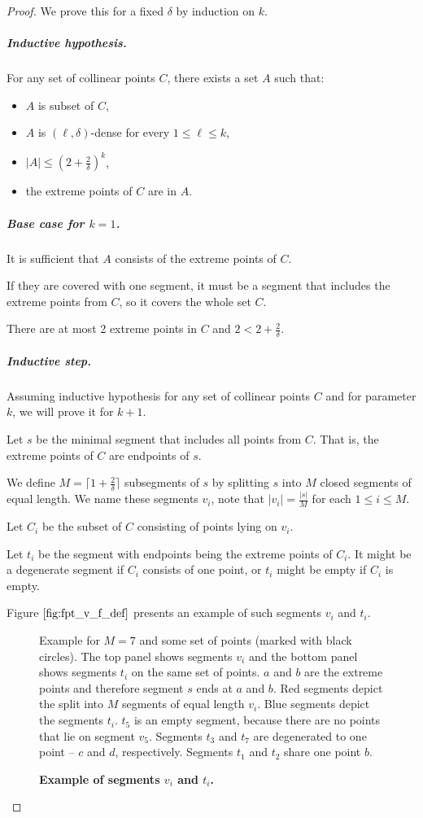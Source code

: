 \begin{proof}
We prove this for a fixed $\delta$ by induction on $k$.

\subparagraph{Inductive hypothesis.}
For any set of collinear points $C$, there exists a set $A$ such that:
\begin{itemize}
\item $A$ is subset of $C$,
\item $A$ is $(\ell, \delta)$-dense for every $1 \le \ell \le k$,
\item $|A| \le (2+\frac{2}{\delta})^k$,
\item the extreme points of $C$ are in $A$.
\end{itemize}

\subparagraph{Base case for $k = 1$.}
It is sufficient that $A$ consists of the extreme points of $C$.

If they are covered with one segment, it must be a segment 
that includes the extreme points from $C$, so it covers the whole set $C$.

There are at most 2 extreme points in $C$ and $2 < 2+\frac{2}{\delta}$.

\subparagraph{Inductive step.}
Assuming inductive hypothesis for any set of collinear points $C$
and for parameter $k$, we will prove it for $k+1$.

Let $s$ be the minimal segment that includes all points from $C$.
That is, the extreme points of $C$ are endpoints of $s$.

We define $M = \lceil1+\frac{2}{\delta}\rceil$ subsegments of $s$
by splitting $s$ into $M$ closed segments of equal length.
We name these segments $v_i$, note that
$|v_i| = \frac{|s|}{M}$ for each $1 \le i \le M$.

Let $C_i$ be the subset of $C$ consisting of points lying on $v_i$.

Let $t_i$ be the segment with endpoints being the extreme points of $C_i$.
It might be a degenerate segment if $C_i$ consists of one point,
or $t_i$ might be empty if $C_i$ is empty.

Figure $\ref{fig:fpt_v_f_def}$ presents an example
of such segments $v_i$ and $t_i$.

\begin{figure}[h]
\begin{center}
\centering
\hspace*{0.6cm}
\def\svgwidth{\textwidth}

\end{center}
\caption{\textbf{Example of segments $v_i$ and $t_i$.}}
Example for $M = 7$ and some set of points (marked with black circles).
The top panel shows segments $v_i$ and the bottom panel shows segments $t_i$
on the same set of points.
$a$ and $b$ are the extreme points and therefore segment $s$
ends at $a$ and $b$.
Red segments depict the split into $M$ segments of equal length $v_i$.
Blue segments depict the segments $t_i$. $t_5$ is an empty segment,
because there are no points that lie on segment $v_5$.
Segments $t_3$ and $t_7$ are degenerated to one point --
$c$ and $d$, respectively.
Segments $t_1$ and $t_2$ share one point $b$.
\label{fig:fpt_v_f_def}
\end{figure}


\end{proof}
